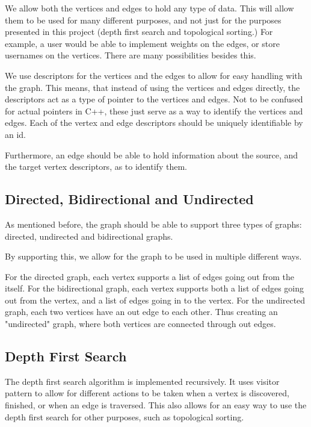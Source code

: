 \documentclass{article}
\begin{document}
We allow both the vertices and edges to hold any type of data.
This will allow them to be used for many different purposes, and not 
just for the purposes presented in this project (depth first search and topological sorting.)
For example, a user would be able to implement weights on the edges, or 
store usernames on the vertices. There are many possibilities besides this.

We use descriptors for the vertices and the edges to allow for easy handling 
with the graph. This means, that instead of using the vertices and edges directly,
the descriptors act as a type of pointer to the vertices and edges. Not to be 
confused for actual pointers in C++, these just serve as a way to identify the 
vertices and edges. Each of the vertex and edge descriptors should be uniquely identifiable 
by an id. 

Furthermore, an edge should be able to hold information about the source, and the target vertex
descriptors, as to identify them.

\subsection{Directed, Bidirectional and Undirected}

As mentioned before, the graph should be able to support three types of graphs: 
directed, undirected and bidirectional graphs. 

By supporting this, we allow for the graph to be used in multiple different ways.

For the directed graph, each vertex supports a list of edges going out from the itself.
For the bidirectional graph, each vertex supports both a list of edges going out from the vertex, and a list of edges going in to the vertex.
For the undirected graph, each two vertices have an out edge to each other. Thus creating an "undirected" graph, where both vertices are connected through out edges.


\subsection{Depth First Search}

The depth first search algorithm is implemented recursively. It uses visitor pattern to allow for different actions to be taken when a vertex is discovered, finished, or when an edge is traversed.
This also allows for an easy way to use the depth first search for other purposes, such as topological sorting.
\end{document}

